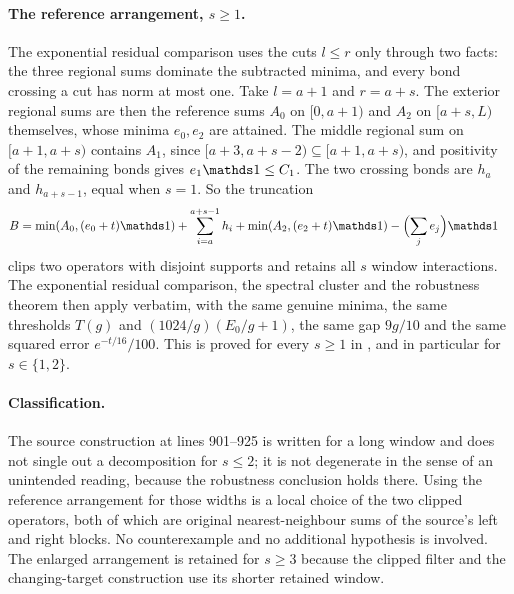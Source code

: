 \documentclass{article}
\begin{document}
\paragraph{The reference arrangement, $s\ge1$.}
The exponential residual comparison uses the cuts $l\le r$ only through
two facts: the three regional sums dominate the subtracted minima, and
every bond crossing a cut has norm at most one. Take $l=a+1$ and $r=a+s$.
The exterior regional sums are then the reference sums $A_0$ on
$[0,a+1)$ and $A_2$ on $[a+s,L)$ themselves, whose minima $e_0,e_2$ are
attained. The middle regional sum on $[a+1,a+s)$ contains $A_1$, since
$[a+3,a+s-2)\subseteq[a+1,a+s)$, and positivity of the remaining bonds
gives $e_1\Id\le C_1$. The two crossing bonds are $h_a$ and $h_{a+s-1}$,
equal when $s=1$. So the truncation
\begin{align}
 B&=\min(A_0,(e_0+t)\Id)+\sum_{i=a}^{a+s-1}h_i+\min(A_2,(e_2+t)\Id)
   -\Bigl(\sum_je_j\Bigr)\Id
 \label{eq:aklv13_two_block_robustness_reference_truncation}
\end{align}
clips two operators with disjoint supports and retains all $s$ window
interactions. The exponential residual comparison, the spectral cluster and
the robustness theorem then apply verbatim, with the same genuine minima,
the same thresholds $T(g)$ and $(1024/g)(E_0/g+1)$, the same gap $9g/10$
and the same squared error $e^{-t/16}/100$. This is proved for every
$s\ge1$ in , and in
particular for $s\in\{1,2\}$.

\paragraph{Classification.}
The source construction at lines 901--925 is written for a long window and
does not single out a decomposition for $s\le2$; it is not degenerate in
the sense of an unintended reading, because the robustness conclusion
holds there. Using the reference arrangement for those widths is a local
choice of the two clipped operators, both of which are original
nearest-neighbour sums of the source's left and right blocks. No
counterexample and no additional hypothesis is involved. The enlarged
arrangement is retained for $s\ge3$ because the clipped filter and the
changing-target construction use its shorter retained window.
\end{document}
